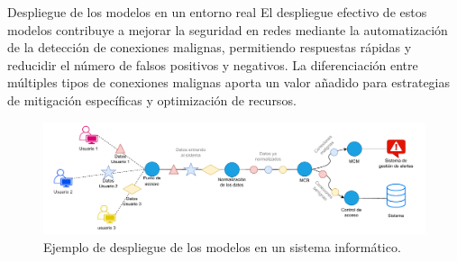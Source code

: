 \begin{frame}{Despliegue de los modelos en un entorno real}
El despliegue efectivo de estos modelos contribuye a mejorar la seguridad en redes mediante la automatización de la detección de conexiones malignas, permitiendo respuestas rápidas y reducidir el número de falsos positivos y negativos. La diferenciación entre múltiples tipos de conexiones malignas aporta un valor añadido para estrategias de mitigación específicas y optimización de recursos.

\begin{figure}[H]
    \centering
    \includegraphics[width=1\textwidth]{../Memoria/img/despliegue/despliegue.pdf}
    \caption{Ejemplo de despliegue de los modelos en un sistema informático.}
    \label{fig:despliegue}
\end{figure}

\end{frame}